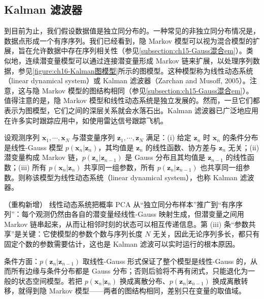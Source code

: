 \documentclass[../../main.tex]{subfiles}
\begin{document}
\subsection{Kalman 滤波器}\label{subsection:ch16-Kalman滤波器}

到目前为止，我们假设数据值是独立同分布的。一种常见的非独立同分布情况是，数据点形成一个有序序列。我们已经看到，隐 Markov 模型可以视为混合模型的扩展，旨在允许数据中存在序列相关性（参见\cref{subsection:ch15-Gauss混合em}）。类似地，连续潜变量模型可以通过连接潜变量形成 Markov 链来扩展，以处理序列数据，参见\cref{figure:ch16-Kalman图模型}所示的图模型。这种模型称为线性动态系统（linear dynamical system）或 Kalman 滤波器（Zarchan and Musoff, 2005）。注意，这与隐 Markov 模型的图结构相同（参见\cref{subsection:ch15-Gauss混合em}）。值得注意的是，隐 Markov 模型和线性动态系统是独立发展的。然而，一旦它们都表示为图模型，它们之间的深层关系就会水落石出。Kalman 滤波器已广泛地应用在许多实时跟踪应用中，如使用雷达信号跟踪飞机。

\begin{definition}[线性动态系统]\label{definition:ch16-线性动态系统}
设观测序列 $\bm{x}_1,\cdots,\bm{x}_N$ 与潜变量序列 $\bm{z}_1,\cdots,\bm{z}_N$ 满足：(i) 给定 $\bm{z}_n$ 时 $\bm{x}_n$ 的条件分布是线性-Gauss 模型 $p(\bm{x}_n|\bm{z}_n)$，其均值是 $\bm{z}_n$ 的线性函数、协方差与 $\bm{z}_n$ 无关；(ii) 潜变量构成 Markov 链，$p(\bm{z}_n|\bm{z}_{n-1})$ 是 Gauss 分布且其均值是 $\bm{z}_{n-1}$ 的线性函数；(iii) 所有 $p(\bm{x}_n|\bm{z}_n)$ 共享同一组参数，所有 $p(\bm{z}_n|\bm{z}_{n-1})$ 也共享同一组参数。则称该模型为线性动态系统（linear dynamical system），也称 Kalman 滤波器。
\end{definition}

\begin{remark}（重构新增）
线性动态系统把概率 PCA 从“独立同分布样本”推广到“有序序列”：每个观测仍然由各自的潜变量经线性-Gauss 映射生成，但潜变量之间用 Markov 链串起来，从而让相邻时刻的状态可以相互传递信息。第 (iii) 条“参数共享”是关键：它使模型的参数个数与序列长度 $N$ 无关，因此无论序列多长，都只有固定个数的参数需要估计，这也是 Kalman 滤波可以实时运行的根本原因。

条件方面：$p(\bm{z}_n|\bm{z}_{n-1})$ 取线性-Gauss 形式保证了整个模型是线性-Gauss 的，从而所有边缘与条件分布都是 Gauss 分布；否则后验将不再有闭式，只能退化为一般的状态空间模型。若把 $p(\bm{x}_n|\bm{z}_n)$ 换成离散分布、$p(\bm{z}_n|\bm{z}_{n-1})$ 换成离散转移，就得到隐 Markov 模型——两者的图结构相同，差别只在变量的取值域。
\end{remark}
\end{document}
